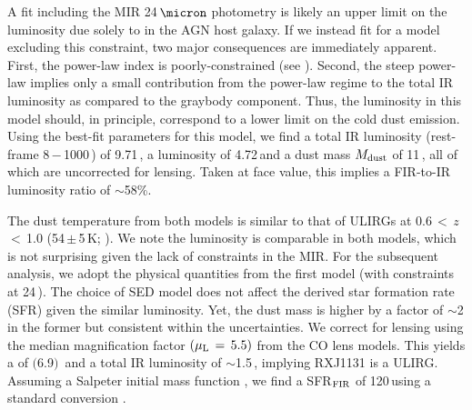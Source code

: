 \documentclass[]{emulateapj}
\begin{document}
A fit including the MIR 24\,$\micron$ photometry
is likely an upper limit on the \fir luminosity due solely to \SF
in the AGN host galaxy.
If we instead fit for a model excluding this constraint,
two major consequences are immediately apparent.
First, the power-law index is poorly-constrained (see ).
Second, the steep power-law implies only a small contribution
from the power-law regime
to the total IR luminosity as compared to the graybody component.
Thus, the \fir luminosity in
this model should, in principle, correspond to a
lower limit on the cold dust emission.
Using the best-fit parameters
for this model, we find a total IR luminosity
\LIR (rest-frame 8\,$-$\,1000\,\micron) of 9.71\,\Lsun,
a \fir luminosity \LFIR of 4.72\,\Lsun and a
dust mass $M_{\rm dust}$ of 11\,\Msun, all of which are uncorrected for lensing.
Taken at face value, this implies a FIR-to-IR luminosity ratio
of $\sim$58\%.

The dust temperature from both models is similar to that of
ULIRGs at 0.6\,$<$\,$z$\,$<$\,1.0 (54\,$\pm$\,5\,K;
\citealt[hereafter C13]{Combes13a}).
We note the \fir luminosity is comparable in both models, which is
not surprising given the lack of constraints in the MIR.
For the subsequent analysis, we adopt the physical quantities
from the first model (\ie with constraints at 24\,\micron).
The choice of SED model does not affect
the derived star formation rate (SFR) given the similar \fir luminosity.
Yet, the dust mass is higher by a factor of $\sim$2 in the former but consistent within the
uncertainties.
We correct for lensing using the median magnification
factor $(\mu_{\rm L}\,=\,5.5)$
from the CO lens models. This yields a
 \LFIR of $($6.9$)$\,\Lsun
 and
 a total IR luminosity of $\sim$1.5\,\Lsun,  implying RXJ1131 is a ULIRG.
Assuming a Salpeter initial
mass function \citep{Salpeter55a}, we find a
SFR$_{\rm FIR}$ of 120\,\sfrU using a
standard conversion \citep{Kennicutt98a}.
\end{document}
